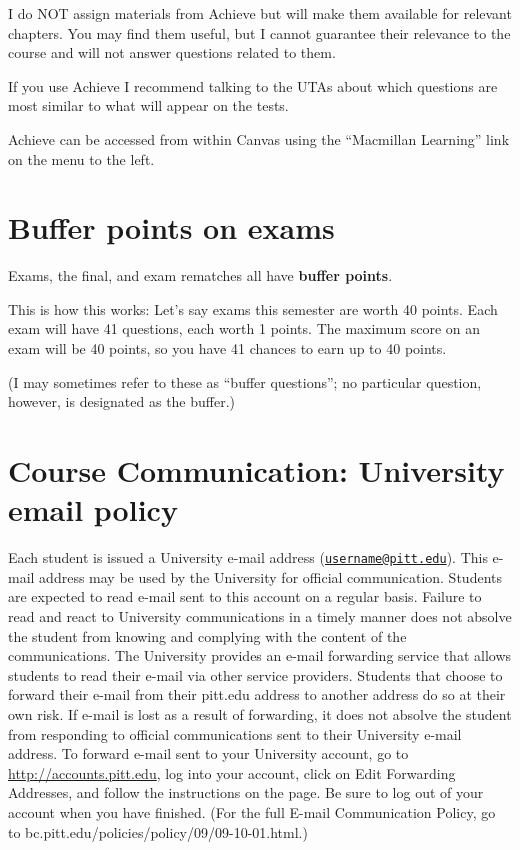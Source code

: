 \documentclass[
]{book}
\begin{document}
I do NOT assign materials from Achieve but will make them available for relevant chapters. You may find them useful, but I cannot guarantee their relevance to the course and will not answer questions related to them.

If you use Achieve I recommend talking to the UTAs about which questions are most similar to what will appear on the tests.

Achieve can be accessed from within Canvas using the ``Macmillan Learning'' link on the menu to the left.

\hypertarget{buffer-points-on-exams}{%
\chapter{Buffer points on exams}\label{buffer-points-on-exams}}

Exams, the final, and exam rematches all have \textbf{buffer points}.

This is how this works: Let's say exams this semester are worth 40 points. Each exam will have 41 questions, each worth 1 points. The maximum score on an exam will be 40 points, so you have 41 chances to earn up to 40 points.

(I may sometimes refer to these as ``buffer questions''; no particular question, however, is designated as the buffer.)

\hypertarget{course-communication-university-email-policy}{%
\chapter{Course Communication: University email policy}\label{course-communication-university-email-policy}}

Each student is issued a University e-mail address (\href{mailto:username@pitt.edu}{\nolinkurl{username@pitt.edu}}). This e-mail address may be used by the University for official communication. Students are expected to read e-mail sent to this account on a regular basis. Failure to read and react to University communications in a timely manner does not absolve the student from knowing and complying with the content of the communications. The University provides an e-mail forwarding service that allows students to read their e-mail via other service providers. Students that choose to forward their e-mail from their pitt.edu address to another address do so at their own risk. If e-mail is lost as a result of forwarding, it does not absolve the student from responding to official communications sent to their University e-mail address. To forward e-mail sent to your University account, go to \url{http://accounts.pitt.edu}, log into your account, click on Edit Forwarding Addresses, and follow the instructions on the page. Be sure to log out of your account when you have finished. (For the full E-mail Communication Policy, go to bc.pitt.edu/policies/policy/09/09-10-01.html.)
\end{document}
